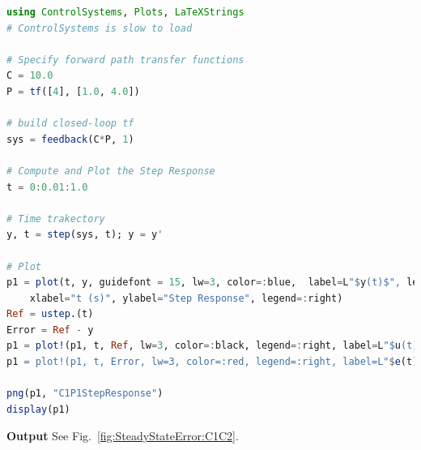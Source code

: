 \begin{lstlisting}[language=Julia,style=mystyle]
using ControlSystems, Plots, LaTeXStrings
# ControlSystems is slow to load

# Specify forward path transfer functions
C = 10.0
P = tf([4], [1.0, 4.0]) 

# build closed-loop tf
sys = feedback(C*P, 1)

# Compute and Plot the Step Response
t = 0:0.01:1.0

# Time trakectory
y, t = step(sys, t); y = y'

# Plot
p1 = plot(t, y, guidefont = 15, lw=3, color=:blue,  label=L"$y(t)$", legendfontsize=15, 
    xlabel="t (s)", ylabel="Step Response", legend=:right)
Ref = ustep.(t)
Error = Ref - y
p1 = plot!(p1, t, Ref, lw=3, color=:black, legend=:right, label=L"$u(t)$" )
p1 = plot!(p1, t, Error, lw=3, color=:red, legend=:right, label=L"$e(t)$" )

png(p1, "C1P1StepResponse")
display(p1)
\end{lstlisting}
\textbf{Output}  See Fig.~\ref{fig:SteadyStateError:C1C2}.

\Qed

\bigskip


